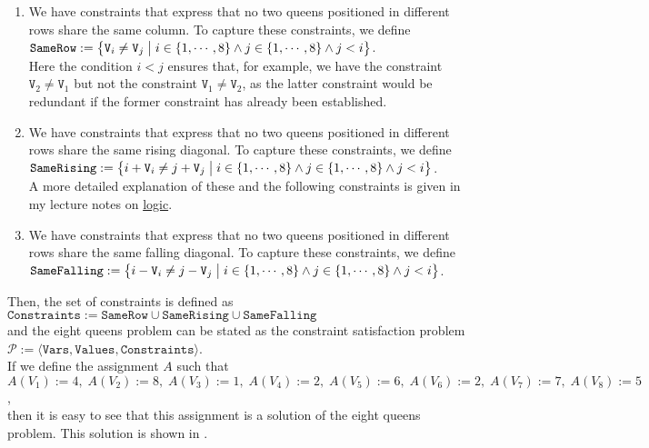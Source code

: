\begin{enumerate}
\item We have constraints that express that no two queens positioned in different rows share the same column.
      To capture these constraints, we define
      \\[0.2cm]
      \hspace*{1.3cm}
      $\texttt{SameRow} := \bigl\{ \texttt{V}_i \not= \texttt{V}_j \bigm| i \in \{1,\cdots,8\} \wedge j \in \{1,\cdots,8\} \wedge j < i \bigr\}$.
      \\[0.2cm]
      Here the condition $i < j$ ensures that, for example, we have the constraint $\texttt{V}_2 \not= \texttt{V}_1$
      but not the constraint  $\texttt{V}_1 \not= \texttt{V}_2$, as the latter constraint would be redundant if
      the former constraint has already been established.
\item We have constraints that express that no two queens positioned in different rows share the same rising
      diagonal.  To capture these constraints, we define
      \\[0.2cm]
      \hspace*{1.3cm}
      $\texttt{SameRising} := \bigl\{ i + \texttt{V}_i \not= j + \texttt{V}_j \bigm| i \in \{1,\cdots,8\}
      \wedge j \in \{1,\cdots,8\} \wedge j < i \bigr\}$.
      \\[0.2cm]
      A more detailed explanation of these and the following constraints is given in my lecture notes on 
      \href{https://github.com/karlstroetmann/Logik/blob/master/Lecture-Notes/logic.pdf}{logic}.
\item We have constraints that express that no two queens positioned in different rows share the same falling
      diagonal.  To capture these constraints, we define
      \\[0.2cm]
      \hspace*{1.3cm}
      $\texttt{SameFalling} := \bigl\{ i - \texttt{V}_i \not= j - \texttt{V}_j \bigm| i \in \{1,\cdots,8\} \wedge j \in \{1,\cdots,8\} \wedge j < i \bigr\}$.
\end{enumerate}
Then, the set of constraints is defined as 
\\[0.2cm]
\hspace*{1.3cm}
$\texttt{Constraints} := \texttt{SameRow} \cup \texttt{SameRising} \cup \texttt{SameFalling}$
\\[0.2cm]
and the eight queens problem can be stated as the constraint satisfaction problem
\\[0.2cm]
\hspace*{1.3cm}
$\mathcal{P} := \langle \texttt{Vars}, \texttt{Values}, \texttt{Constraints} \rangle$.
\\[0.2cm]
If we define the assignment $A$ such that
\\[0.2cm]
\hspace*{1.3cm}
$A(V_1) := 4,\; A(V_2) := 8,\; A(V_3) := 1,\; A(V_4) := 2,\; A(V_5) := 6,\; A(V_6) := 2,\; A(V_7) := 7,\; A(V_8) := 5$,
\\[0.2cm]
then it is easy to see that this assignment is a solution of the eight queens problem.  This solution is shown
in .


